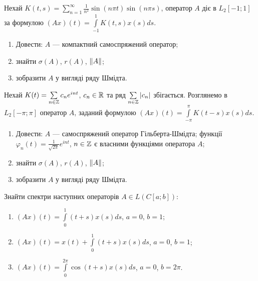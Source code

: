 
\begin{exercise}
    Нехай $K(t,s) = \sum\limits^\infty_{n=1} \frac{1}{n^2} \sin(n \pi t) \sin(n \pi s)$,
    оператор $A$ діє в $L_2[-1;1]$ за формулою $(Ax)(t) = \int\limits^1_{-1} K(t,s) x(s) ds$.
    \begin{enumerate}
        \item Довести: $A$ --- компактний самоспряжений оператор;
        \item знайти $\sigma(A)$, $r(A)$, $\left\lVert A\right\rVert$;
        \item зобразити $A$ у вигляді ряду Шмідта.
    \end{enumerate}
\end{exercise}

\begin{exercise}
    Нехай $K(t) = \sum\limits_{n \in \mathbb{Z}} c_n e^{i n t}$, $c_n \in \mathbb{R}$ та ряд
    $\sum\limits_{n \in \mathbb{Z}} |c_n|$ збігається.
    Розглянемо в $L_2[-\pi; \pi]$
    оператор $A$, заданий формулою $(Ax)(t) = \int\limits^\pi_{-\pi} K(t-s) x(s) ds$.
    \begin{enumerate}
        \item Довести: $A$ --- самоспряжений оператор Гільберта-Шмідта; функції \\$\varphi_n(t) = 
        \frac{1}{\sqrt{2\pi}} e^{i n t}$, $n \in \mathbb{Z}$ є власними функціями оператора $A$;
        \item знайти $\sigma(A)$, $r(A)$, $\left\lVert A\right\rVert$;
        \item зобразити $A$ у вигляді ряду Шмідта.
    \end{enumerate}
\end{exercise}

\begin{exercise}
    Знайти спектри наступних операторів $A \in L(C[a;b])$:
    \begin{enumerate}
        \item $(Ax)(t) = \int\limits^1_0 (t+s)x(s)ds$, $a=0$, $b=1$;
        \item $(Ax)(t) = x(t) + \int\limits^1_0 (t+s)x(s)ds$, $a=0$, $b=1$;
        \item $(Ax)(t) = \int\limits^{2\pi}_0 \cos(t+s)x(s)ds$, $a=0$, $b=2\pi$.
    \end{enumerate}
\end{exercise}

